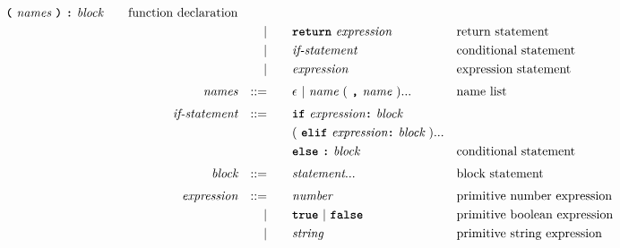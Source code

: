 \begin{alignat*}{9}
                                   \textbf{\texttt{(}}\  \textit{names} \ \textbf{\texttt{)}}\ \textbf{\texttt{:}}\ \textit{block} \quad
                                                           && \textrm{function declaration}\\
&&                       && |   &\quad && \textbf{\texttt{return}}\  \textit{expression}
                                                           && \textrm{return statement}\\
&&                       && |   &\quad && \textit{if-statement} \quad
                                                           && \textrm{conditional statement}\\
&&                       && |   &\quad &&  \textit{expression}
                                                           && \textrm{expression statement} \\[1mm]
&& \textit{names}   && ::= &\quad &&  \epsilon\ | \  \textit{name} \ 
                                                   (\ \textbf{\texttt{,}} \ \textit{name}\ ) ...
                                                            && \textrm{name list}   \\[1mm]
&& \textit{if-statement} && ::= &\quad && \textbf{\texttt{if}} \ \textit{expression} \textbf{\texttt{:}} \ \textit{block} \\
&&                       &&     &      && (\ \textbf{\texttt{elif}} \ \textit{expression} \textbf{\texttt{:}} \ \textit{block}\ )... \\
&&                       &&     &      && \textbf{\texttt{else}}\ \textbf{\texttt{:}} \ \textit{block} 
                                                            && \textrm{conditional statement}   \\[1mm]
&& \textit{block}        && ::= &      && \textit{statement}... \quad
                                                           && \textrm{block statement}\\[1mm]         
&& \textit{expression}   && ::= &\quad &&  \textit{number}   && \textrm{primitive number expression}\\
&&                       && |   &\quad && \textbf{\texttt{true}}\ |\ \textbf{\texttt{false}}
                                                           && \textrm{primitive boolean expression}\\
&&                       && |   &\quad &&  \textit{string}   && \textrm{primitive string expression}\\

\end{alignat*}
